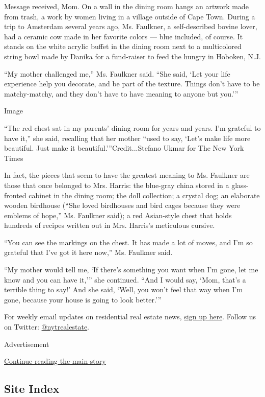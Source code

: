 Message received, Mom. On a wall in the dining room hangs an artwork
made from trash, a work by women living in a village outside of Cape
Town. During a trip to Amsterdam several years ago, Ms. Faulkner, a
self-described bovine lover, had a ceramic cow made in her favorite
colors --- blue included, of course. It stands on the white acrylic
buffet in the dining room next to a multicolored string bowl made by
Danika for a fund-raiser to feed the hungry in Hoboken, N.J.

``My mother challenged me,'' Ms. Faulkner said. ``She said, `Let your
life experience help you decorate, and be part of the texture. Things
don't have to be matchy-matchy, and they don't have to have meaning to
anyone but you.'''

Image

``The red chest sat in my parents' dining room for years and years. I'm
grateful to have it,'' she said, recalling that her mother ``used to
say, `Let's make life more beautiful. Just make it
beautiful.'''Credit...Stefano Ukmar for The New York Times

In fact, the pieces that seem to have the greatest meaning to Ms.
Faulkner are those that once belonged to Mrs. Harris: the blue-gray
china stored in a glass-fronted cabinet in the dining room; the doll
collection; a crystal dog; an elaborate wooden birdhouse (``She loved
birdhouses and bird cages because they were emblems of hope,'' Ms.
Faulkner said); a red Asian-style chest that holds hundreds of recipes
written out in Mrs. Harris's meticulous cursive.

``You can see the markings on the chest. It has made a lot of moves, and
I'm so grateful that I've got it here now,'' Ms. Faulkner said.

``My mother would tell me, `If there's something you want when I'm gone,
let me know and you can have it,''' she continued. ``And I would say,
`Mom, that's a terrible thing to say!' And she said, `Well, you won't
feel that way when I'm gone, because your house is going to look
better.'''

For weekly email updates on residential real estate news,
\href{http://www.nytimes.com/newsletters/realestate/}{sign up here}.
Follow us on Twitter:
\href{https://twitter.com/nytrealestate}{@nytrealestate}.

Advertisement

\protect\hyperlink{after-bottom}{Continue reading the main story}

\hypertarget{site-index}{%
\subsection{Site Index}\label{site-index}}

